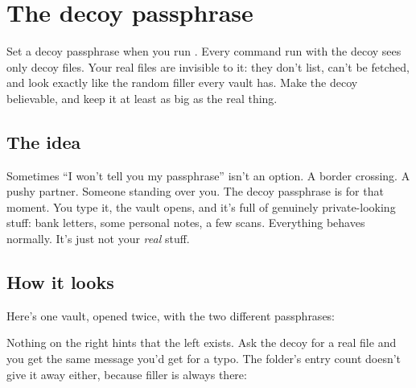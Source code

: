\documentclass[10pt,oneside,openany]{book}
\begin{document}
\chapter{The decoy passphrase}

\begin{tldr}
Set a decoy passphrase when you run . Every command run with
the decoy sees only decoy files. Your real files are invisible to it: they
don't list, can't be fetched, and look exactly like the random filler every
vault has. Make the decoy believable, and keep it at least as big as the real
thing.
\end{tldr}

\section{The idea}

Sometimes ``I won't tell you my passphrase'' isn't an option. A border
crossing. A pushy partner. Someone standing over you. The decoy passphrase is
for that moment. You type it, the vault opens, and it's full of genuinely
private-looking stuff: bank letters, some personal notes, a few scans.
Everything behaves normally. It's just not your \emph{real} stuff.

\section{How it looks}

Here's one vault, opened twice, with the two different passphrases:


Nothing on the right hints that the left exists. Ask the decoy for a real
file and you get the same message you'd get for a typo. The folder's entry
count doesn't give it away either, because filler is always there:

\end{document}
